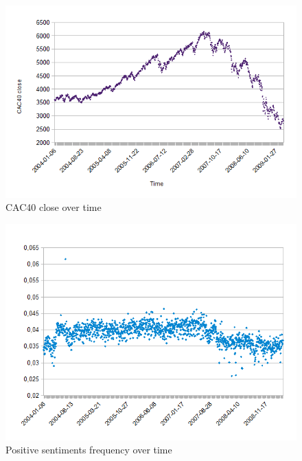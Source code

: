 \documentclass{beamer}
\begin{document}
\begin{frame}
	\begin{figure}
		\caption{CAC40 close over time}
		\includegraphics[scale=.5]{plots/time/cac.png}
	\end{figure}
\end{frame}

\begin{frame}
	\begin{figure}
		\caption{Positive sentiments frequency over time}
		\includegraphics[scale=.5]{plots/time/pos.png}
	\end{figure}
\end{frame}
\end{document}

